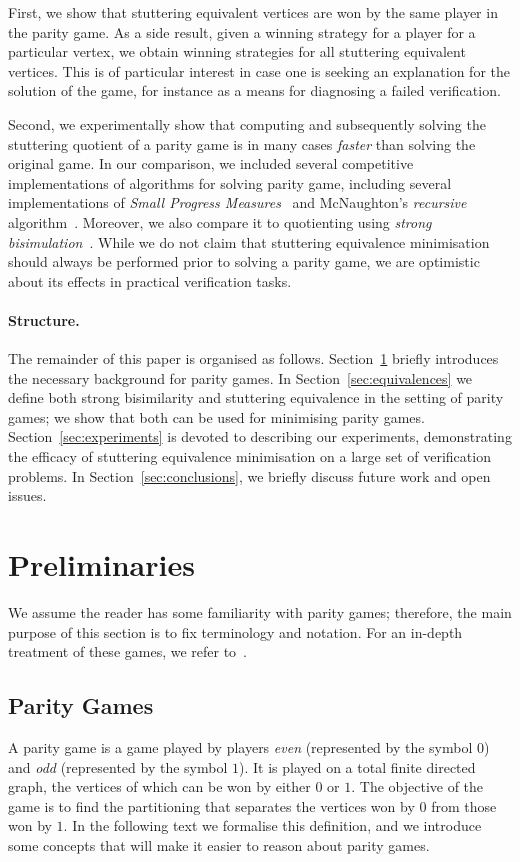 \documentclass[a4paper]{llncs}
\newcommand{\even}{\ensuremath{0}\xspace}
\newcommand{\odd}{\ensuremath{1}\xspace}
\begin{document}
First, we show that stuttering equivalent vertices are won by the same
player in the parity game.  As a side result, given a winning strategy
for a player for a particular vertex, we obtain winning strategies for
all stuttering equivalent vertices.  This is of particular interest
in case one is seeking an explanation for the solution of the game,
for instance as a means for diagnosing a failed verification.

Second, we experimentally show that computing and subsequently
solving the stuttering quotient of a parity game is in many cases
\emph{faster} than solving the original game.  In our comparison,
we included several competitive implementations of algorithms for
solving parity game, including several implementations of \emph{Small
Progress Measures}~\cite{Jur:00} and McNaughton's \emph{recursive}
algorithm~\cite{McN:93}.  Moreover, we also compare it to quotienting
using \emph{strong bisimulation}~\cite{Par:81}.  While we do not claim
that stuttering equivalence minimisation should always be performed
prior to solving a parity game, we are optimistic about its effects in
practical verification tasks.




\paragraph{Structure.} The remainder of this paper is organised
as follows. Section~\ref{sec:preliminaries} briefly introduces the
necessary background for parity games. In Section~\ref{sec:equivalences}
we define both strong bisimilarity and stuttering equivalence
in the setting of parity games; we show that both can be used for
minimising parity games. Section~\ref{sec:experiments} is devoted to
describing our experiments, demonstrating the efficacy of stuttering
equivalence minimisation on a large set of verification problems.
In Section~\ref{sec:conclusions}, we briefly discuss future work and
open issues.

\section{Preliminaries}
\label{sec:preliminaries}

We assume the reader has some familiarity with
parity games; therefore, the  main purpose of this section is to fix
terminology and notation. For an in-depth treatment of these games,
we refer to~\cite{McN:93,Zie:98}.

\subsection{Parity Games}
A parity game is a game played by players \emph{even} (represented by
the symbol $\even$) and \emph{odd} (represented by the symbol $\odd$). 
It is played on a total finite directed graph, the vertices of which can be won
by either $\even$ or $\odd$. The objective of the game is to find the 
partitioning that separates the vertices won by $\even$ from those won by $\odd$.
In the following text we formalise this definition, and we introduce some
concepts that will make it easier to reason about parity games.
\end{document}
